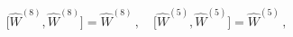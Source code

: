 \begin{equation}
\label{e:idealbrackets}
\big[ \hat{W}^{(8)}, \hat{W}^{(8)} \big] = \hat{W}^{(8)}\,,\quad
\big[ \hat{W}^{(5)}, \hat{W}^{(5)} \big] = \hat{W}^{(5)}\,,
\end{equation}

